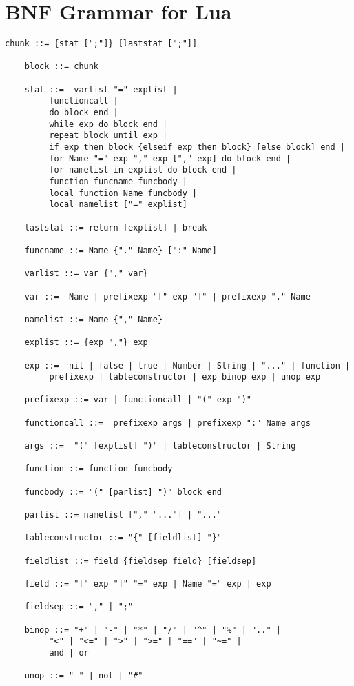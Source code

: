\documentclass[12pt]{article}
\begin{document}
\section{BNF Grammar for Lua}
\begin{verbatim}
chunk ::= {stat [";"]} [laststat [";"]]

	block ::= chunk

	stat ::=  varlist "=" explist | 
		 functioncall | 
		 do block end | 
		 while exp do block end | 
		 repeat block until exp | 
		 if exp then block {elseif exp then block} [else block] end | 
		 for Name "=" exp "," exp ["," exp] do block end | 
		 for namelist in explist do block end | 
		 function funcname funcbody | 
		 local function Name funcbody | 
		 local namelist ["=" explist] 

	laststat ::= return [explist] | break

	funcname ::= Name {"." Name} [":" Name]

	varlist ::= var {"," var}

	var ::=  Name | prefixexp "[" exp "]" | prefixexp "." Name 

	namelist ::= Name {"," Name}

	explist ::= {exp ","} exp

	exp ::=  nil | false | true | Number | String | "..." | function | 
		 prefixexp | tableconstructor | exp binop exp | unop exp 

	prefixexp ::= var | functioncall | "(" exp ")"

	functioncall ::=  prefixexp args | prefixexp ":" Name args 

	args ::=  "(" [explist] ")" | tableconstructor | String 

	function ::= function funcbody

	funcbody ::= "(" [parlist] ")" block end

	parlist ::= namelist ["," "..."] | "..."

	tableconstructor ::= "{" [fieldlist] "}"

	fieldlist ::= field {fieldsep field} [fieldsep]

	field ::= "[" exp "]" "=" exp | Name "=" exp | exp

	fieldsep ::= "," | ";"

	binop ::= "+" | "-" | "*" | "/" | "^" | "%" | ".." | 
		 "<" | "<=" | ">" | ">=" | "==" | "~=" | 
		 and | or

	unop ::= "-" | not | "#"

\end{verbatim}
\end{document}
